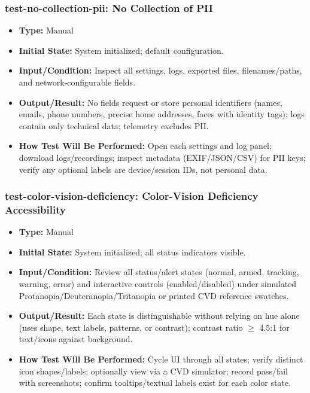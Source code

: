 \documentclass[12pt, titlepage]{article}
\begin{document}
\subsubsection*{test-no-collection-pii: No Collection of PII}
\begin{itemize}
  \item \textbf{Type:} Manual
  \item \textbf{Initial State:} System initialized; default configuration.
  \item \textbf{Input/Condition:} Inspect all settings, logs, exported files, filenames/paths, and network-configurable fields.
  \item \textbf{Output/Result:} No fields request or store personal identifiers (names, emails, phone numbers, precise home addresses, faces with identity tags); logs contain only technical data; telemetry excludes PII.
  \item \textbf{How Test Will Be Performed:} Open each settings and log panel; download logs/recordings; inspect metadata (EXIF/JSON/CSV) for PII keys; verify any optional labels are device/session IDs, not personal data.
\end{itemize}

\subsubsection*{test-color-vision-deficiency: Color-Vision Deficiency Accessibility}
\begin{itemize}
  \item \textbf{Type:} Manual
  \item \textbf{Initial State:} System initialized; all status indicators visible.
  \item \textbf{Input/Condition:} Review all status/alert states (normal, armed, tracking, warning, error) and interactive controls (enabled/disabled) under simulated Protanopia/Deuteranopia/Tritanopia or printed CVD reference swatches.
  \item \textbf{Output/Result:} Each state is distinguishable without relying on hue alone (uses shape, text labels, patterns, or contrast); contrast ratio \(\geq\) 4.5:1 for text/icons against background.
  \item \textbf{How Test Will Be Performed:} Cycle UI through all states; verify distinct icon shapes/labels; optionally view via a CVD simulator; record pass/fail with screenshots; confirm tooltips/textual labels exist for each color state.
\end{itemize}
\end{document}
